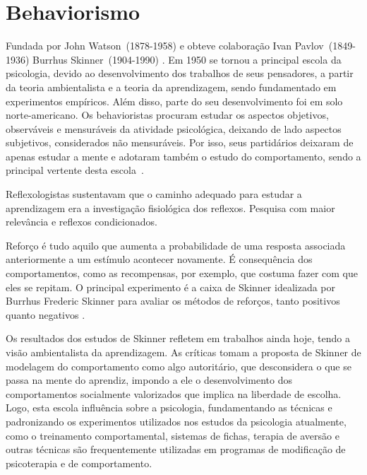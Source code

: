 \section{Behaviorismo}\label{behaviorismo}

Fundada por John Watson~(1878-1958) e obteve colaboração Ivan Pavlov~(1849-1936) Burrhus Skinner~(1904-1990) \cite{hothersall1997historia}.
Em 1950 se tornou a principal escola da psicologia, devido ao desenvolvimento dos trabalhos de seus pensadores, a partir da teoria ambientalista e a teoria da aprendizagem, sendo fundamentado em experimentos empíricos.
Além disso, parte do seu desenvolvimento foi em solo norte-americano.
Os behavioristas procuram estudar os aspectos objetivos, observáveis e mensuráveis da atividade psicológica, deixando de lado aspectos subjetivos, considerados não mensuráveis. 
Por isso, seus partidários deixaram de apenas estudar a mente e adotaram também o estudo do comportamento, sendo a principal vertente desta escola~\cite{bock1999psicologias}.

Reflexologistas sustentavam que o caminho adequado para estudar a aprendizagem era a investigação fisiológica dos reflexos. Pesquisa com maior relevância e reflexos condicionados.

Reforço é tudo aquilo que aumenta a probabilidade de uma resposta associada anteriormente a um estímulo acontecer novamente. É consequência dos comportamentos, como as recompensas, por exemplo, que costuma fazer com que eles se repitam.
O principal experimento é a caixa de Skinner idealizada por Burrhus Frederic Skinner para avaliar os  métodos de reforços, tanto positivos quanto negativos \cite{silva2007psicologia_educacao}.

Os resultados dos estudos de Skinner refletem em trabalhos ainda hoje, tendo a visão ambientalista da aprendizagem. 
As críticas tomam a proposta de Skinner de modelagem do comportamento como algo autoritário, que desconsidera o que se passa na mente do aprendiz, impondo a ele o desenvolvimento dos comportamentos
socialmente valorizados que implica na liberdade de escolha.
Logo, esta escola influência  sobre a psicologia, fundamentando as técnicas e padronizando os experimentos utilizados nos estudos da psicologia atualmente, como o treinamento comportamental, sistemas de fichas, terapia de aversão e outras técnicas são frequentemente utilizadas em programas de modificação de psicoterapia e de comportamento.
